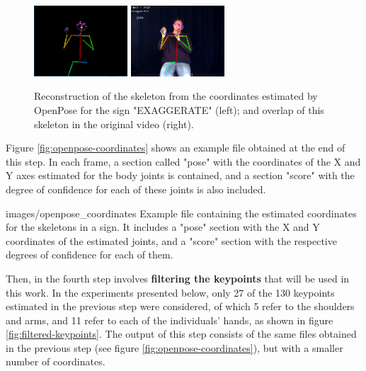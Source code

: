\begin{figure}[ht]
    \centering
    \includegraphics[width=3.5cm]{images/sign_pose}
    \includegraphics[width=3.5cm]{images/sign_pose_blended}
    \caption{Reconstruction of the skeleton from the coordinates estimated by OpenPose for the sign "EXAGGERATE" (left); and overlap of this skeleton in the original video (right).}
    \label{fig:sign-pose}
\end{figure}

Figure \ref{fig:openpose-coordinates} shows an example file obtained at the end of this step. In each frame, a section called "pose" with the coordinates of the X and Y axes estimated for  the body joints is contained, and a section "score" with the degree of confidence for each of these joints is also included.

    {images/openpose_coordinates}
    {Example file containing the estimated coordinates for the skeletons in a sign. It includes a "pose" section with the X and Y coordinates of the estimated joints, and a "score" section with the respective degrees of confidence for each of them.}
    
Then, in the fourth step involves \textbf{filtering the keypoints} that will be used in this work. In the experiments presented below, only 27 of the 130 keypoints estimated in the previous step were considered, of which 5 refer to the shoulders and arms, and 11 refer to each of the individuals' hands, as shown in figure \ref{fig:filtered-keypoints}. The output of this step consists of the same files obtained in the previous step (see figure \ref{fig:openpose-coordinates}), but with a smaller number of coordinates.

